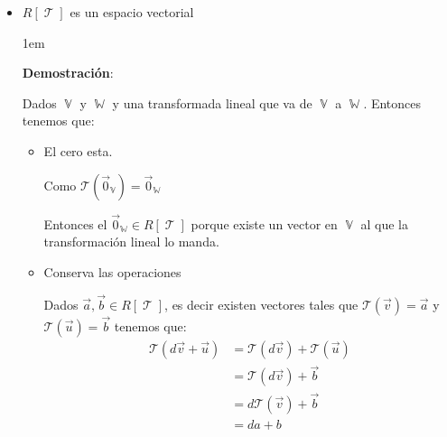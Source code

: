 \documentclass[12pt, fleqn]{report}                             %
\newenvironment{SmallIndentation}[1][0.75em]                    %
        {\begin{adjustwidth}{#1}{}\begin{footnotesize}}             %
        {\end{footnotesize}\end{adjustwidth}}                       %
\theoremstyle{break}                                            %
\DeclareMathOperator \VectorSet    {\mathbb{V}}                 %
\DeclareMathOperator \SubVectorSet {\mathbb{W}}                 %
\DeclareMathOperator \LinealTransformation {\mathcal{T}}        %
\newcommand{\Wrap}[1]    {\left( #1 \right)}                    %
\newcommand{\FnLinTrans}[1]{\mathcal{T}\Wrap{#1}}               %
\begin{document}
\begin{itemize}
\begin{SmallIndentation}[1em]
\begin{itemize}
                            \end{itemize}

                        \end{SmallIndentation}

                    \item $R[\LinealTransformation]$ es un espacio vectorial

                        \begin{SmallIndentation}[1em]
                            \textbf{Demostración}:
                            
                            Dados $\VectorSet$ y $\SubVectorSet$ y una transformada lineal
                            que va de $\VectorSet$ a $\SubVectorSet$.
                            Entonces tenemos que:

                            \begin{itemize}
                                \item 
                                    El cero esta.

                                    Como $\FnLinTrans{\vec 0_{\VectorSet}} = \vec 0_{\SubVectorSet}$

                                    Entonces el $\vec 0_{\SubVectorSet} \in R[\LinealTransformation]$
                                    porque existe un vector en $\VectorSet$ al que la transformación lineal
                                    lo manda.

                                \item 
                                    Conserva las operaciones

                                    Dados $\vec a, \vec b \in R[\LinealTransformation]$, es decir
                                    existen vectores tales que $\FnLinTrans{\vec v} = \vec a$ y
                                    $\FnLinTrans{\vec u} = \vec b$ tenemos que:
                                    \begin{align*}
                                        \FnLinTrans{d\vec v + \vec u}
                                            &= \FnLinTrans{d\vec v} + \FnLinTrans{\vec u}       \\
                                            &= \FnLinTrans{d\vec v} + \vec b                    \\
                                            &= d\FnLinTrans{\vec v} + \vec b                    \\
                                            &= da + b                                           
                                    \end{align*}


\end{itemize}
\end{SmallIndentation}
\end{itemize}
\end{document}
